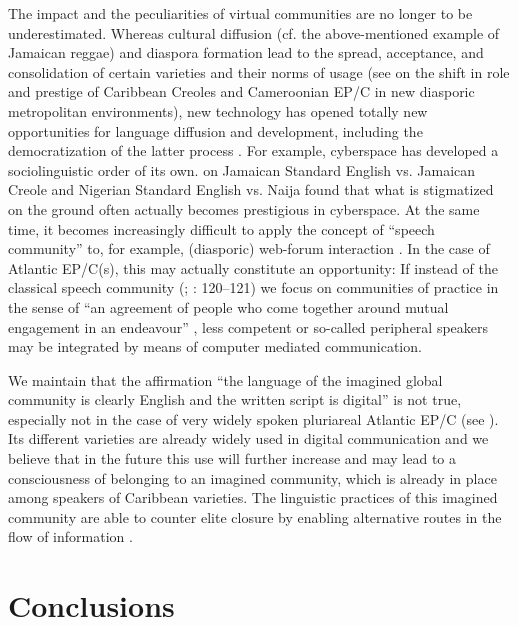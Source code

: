 \documentclass[output=paper,colorlinks,citecolor=brown]{langscibook}
\begin{document}
The impact and the peculiarities of virtual communities are no longer to be underestimated. Whereas cultural diffusion (cf. the above-mentioned example of Jamaican reggae) and diaspora formation lead to the spread, acceptance, and consolidation of certain varieties and their norms of usage (see \cite{Muhleisen_Schroder_2017} on the shift in role and prestige of Caribbean Creoles and Cameroonian EP/C in new diasporic metropolitan environments), new technology has opened totally new opportunities for language diffusion and development, including the democratization of the latter process \citep[cf.][]{Eisenlohr_2004,Bartens_2019}. For example, cyberspace has developed a sociolinguistic order of its own. \citet{Mair_2019} on Jamaican Standard English vs. Jamaican Creole and Nigerian Standard English vs. Naija found that what is stigmatized on the ground often actually becomes prestigious in cyberspace. At the same time, it becomes increasingly difficult to apply the concept of “speech community” to, for example, (diasporic) web-forum interaction \citep[91]{Moll_2017}. In the case of Atlantic EP/C(s), this may actually constitute an opportunity: If instead of the classical speech community (\cite{Gumperz_1968}; \cite{Labov_1972}: 120--121) we focus on communities of practice in the sense of “an agreement of people who come together around mutual engagement in an endeavour” \citep[464]{Eckert_McConnellGinet_1992}, less competent or so-called peripheral speakers \citep{Labov_1972} may be integrated by means of computer mediated communication.

We maintain that the affirmation “the language of the imagined global community is clearly English and the written script is digital” \citep[xvii]{Muhleisen_2017} is not true, especially not in the case of very widely spoken pluriareal Atlantic EP/C (see ). Its different varieties are already widely used in digital communication and we believe that in the future this use will further increase and may lead to a consciousness of belonging to an imagined community, which is already in place among speakers of Caribbean varieties. The linguistic practices of this imagined community are able to counter elite closure by enabling alternative routes in the flow of information \citep[cf.][284, 311]{DeGraff_2014}.

\section{Conclusions}\label{sec:04:5}
\end{document}
